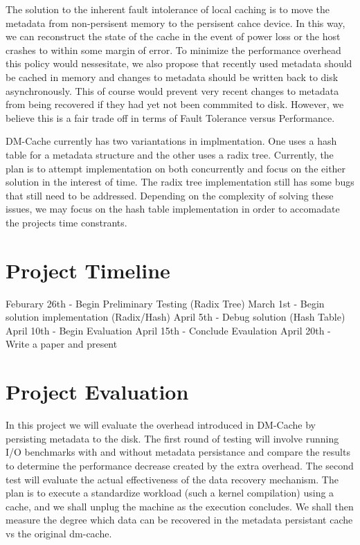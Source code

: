 \documentclass[letterpaper,12pt]{article}
\begin{document}
The solution to the inherent fault intolerance of local caching is to move the
metadata from non-persisent memory to the persisent cahce device.  In this way, we
can reconstruct the state of the cache in the event of power loss or the host crashes 
to within some margin of error.  To minimize the performance overhead this policy would 
nessesitate, we also propose that recently used metadata should be cached in memory and 
changes to metadata should be written back to disk asynchronously.  This of course would
prevent very recent changes to metadata from being recovered if they had yet not been
commmited to disk.  However, we believe this is a fair trade off in terms of 
Fault Tolerance versus Performance.  

DM-Cache currently has two variantations in implmentation. One uses a hash table 
for a metadata structure and the other uses a radix tree. Currently, the plan is to
attempt implementation on both concurrently and focus on the either solution
in the interest of time. The radix tree implementation still has some bugs that still need to be 
addressed. Depending on the complexity of solving these issues, we may focus on the hash table
implementation in order to accomadate the projects time constrants. 



\section*{Project Timeline}

Feburary 26th - Begin Preliminary Testing (Radix Tree)
March 1st - Begin solution implementation (Radix/Hash)
April 5th - Debug solution (Hash Table)
April 10th - Begin Evaluation
April 15th - Conclude Evaulation
April 20th - Write a paper and present


\section*{Project Evaluation}

In this project we will evaluate the overhead introduced in DM-Cache
by persisting metadata to the disk.  The first round of testing will involve 
running I/O benchmarks with and without metadata persistance and compare the 
results to determine the performance decrease created by the extra overhead. 
The second test will evaluate the actual effectiveness of the data recovery mechanism.
The plan is to execute a standardize workload (such a kernel compilation) using a cache,
and we shall unplug the machine as the execution concludes.  We shall then measure the degree 
which data can be recovered in the metadata persistant cache vs the original dm-cache.





\end{document}
